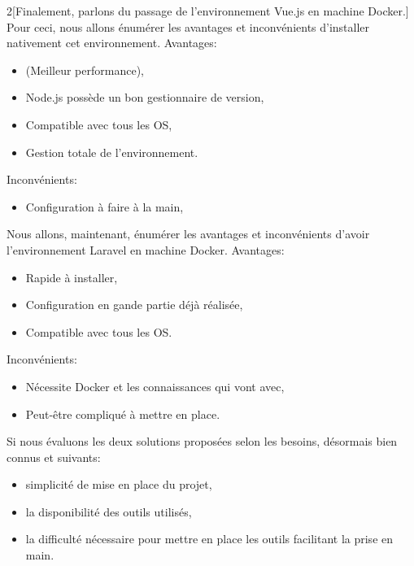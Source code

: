 \documentclass[
    iai, %
    il, %
]{heig-tb}
\begin{document}
\begin{multicols}{2}[Finalement, parlons du passage de l'environnement Vue.js en machine Docker.]
    Pour ceci, nous allons énumérer les avantages et inconvénients d'installer nativement cet environnement.
    Avantages:
    \begin{itemize}
        \item (Meilleur performance),
        \item Node.js possède un bon gestionnaire de version,
        \item Compatible avec tous les OS,
        \item Gestion totale de l'environnement.
    \end{itemize}

    Inconvénients:
    \begin{itemize}
        \item Configuration à faire à la main,
    \end{itemize}

    \columnbreak
    Nous allons, maintenant, énumérer les avantages et inconvénients d'avoir l'environnement Laravel en machine Docker.
    Avantages:
    \begin{itemize}
        \item Rapide à installer,
        \item Configuration en gande partie déjà réalisée,
        \item Compatible avec tous les OS.
    \end{itemize}

    Inconvénients:
    \begin{itemize}
        \item Nécessite Docker et les connaissances qui vont avec,
        \item Peut-être compliqué à mettre en place.
    \end{itemize}
\end{multicols}

Si nous évaluons les deux solutions proposées selon les besoins, désormais bien connus et suivants:
\begin{itemize}
    \item simplicité de mise en place du projet,
    \item la disponibilité des outils utilisés,
    \item la difficulté nécessaire pour mettre en place les outils facilitant la prise en main.
\end{itemize}
\end{document}
